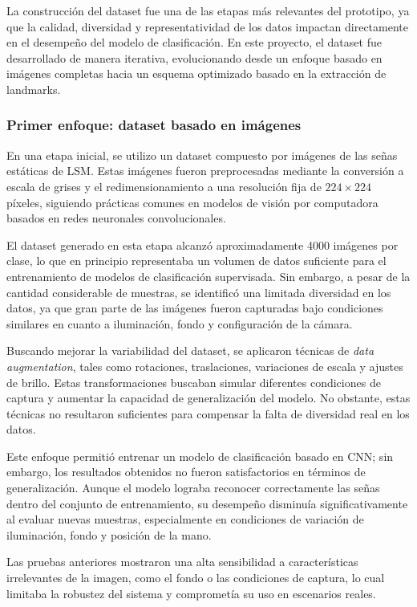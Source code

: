 	La construcción del dataset fue una de las etapas más relevantes del prototipo, ya que la calidad, diversidad y representatividad de los datos impactan directamente en el desempeño del modelo de clasificación. En este proyecto, el dataset fue desarrollado de manera iterativa, evolucionando desde un enfoque basado en imágenes completas hacia un esquema optimizado basado en la extracción de landmarks.
	
	\subsubsection{Primer enfoque: dataset basado en imágenes}
	
	En una etapa inicial, se utilizo un dataset compuesto por imágenes de las señas estáticas de LSM. Estas imágenes fueron preprocesadas mediante la conversión a escala de grises y el redimensionamiento a una resolución fija de $224 \times 224$ píxeles, siguiendo prácticas comunes en modelos de visión por computadora basados en redes neuronales convolucionales.
	
	El dataset generado en esta etapa alcanzó aproximadamente 4000 imágenes por clase, lo que en principio representaba un volumen de datos suficiente para el entrenamiento de modelos de clasificación supervisada. Sin embargo, a pesar de la cantidad considerable de muestras, se identificó una limitada diversidad en los datos, ya que gran parte de las imágenes fueron capturadas bajo condiciones similares en cuanto a iluminación, fondo y configuración de la cámara.
	
	Buscando mejorar la variabilidad del dataset, se aplicaron técnicas de \textit{data augmentation}, tales como rotaciones, traslaciones, variaciones de escala y ajustes de brillo. Estas transformaciones buscaban simular diferentes condiciones de captura y aumentar la capacidad de generalización del modelo. No obstante, estas técnicas no resultaron suficientes para compensar la falta de diversidad real en los datos.
	
	Este enfoque permitió entrenar un modelo de clasificación basado en CNN; sin embargo, los resultados obtenidos no fueron satisfactorios en términos de generalización. Aunque el modelo lograba reconocer correctamente las señas dentro del conjunto de entrenamiento, su desempeño disminuía significativamente al evaluar nuevas muestras, especialmente en condiciones de variación de iluminación, fondo y posición de la mano.
	
	Las pruebas anteriores mostraron una alta sensibilidad a características irrelevantes de la imagen, como el fondo o las condiciones de captura, lo cual limitaba la robustez del sistema y comprometía su uso en escenarios reales.
	

